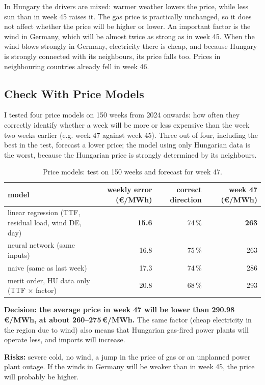 \documentclass[10pt,a4paper]{article}
\begin{document}
In Hungary the drivers are mixed: warmer weather lowers the price, while less sun than in week 45 raises it. The
gas price is practically unchanged, so it does not affect whether the price will be higher or lower. An important factor is the wind in Germany, which will be almost twice as strong as in week 45. When the wind blows strongly in
Germany, electricity there is cheap, and because Hungary is strongly connected with its neighbours, its price
falls too. Prices in neighbouring countries already fell in week 46.

\subsection*{Check With Price Models}

I tested four price models on 150 weeks from 2024 onwards: how often they correctly identify whether a week will
be more or less expensive than the week two weeks earlier (e.g. week 47 against week 45). Three out of four,
including the best in the test, forecast a lower price; the model using only Hungarian data is the worst,
because the Hungarian price is strongly determined by its neighbours.

\begin{table}[H]
\centering\footnotesize
\footnotesize\setlength{\tabcolsep}{4pt}
\begin{tabular}{lrrr}
\toprule
model & weekly error (€/MWh) & correct direction & week 47 (€/MWh) \\
\midrule
linear regression (TTF, residual load, wind DE, day) & \textbf{15.6} & 74\,\% & \textbf{263} \\
neural network (same inputs) & 16.8 & 75\,\% & 263 \\
naive (same as last week) & 17.3 & 74\,\% & 286 \\
merit order, HU data only (TTF × factor) & 20.8 & 68\,\% & 293 \\
\bottomrule
\end{tabular}
\caption{Price models: test on 150 weeks and forecast for week 47.}
\end{table}
\vspace{-8pt}

\textbf{Decision: the average price in week 47 will be lower than 290.98\,€/MWh, at about 260–275\,€/MWh.} The same factor (cheap electricity in the region due to wind) also means that Hungarian gas-fired power plants will operate less, and imports will increase.

\textbf{Risks:} severe cold, no wind, a jump in the price of gas or an unplanned power plant outage. If the winds in Germany will be weaker than in week 45, the price will probably be higher.
\end{document}
